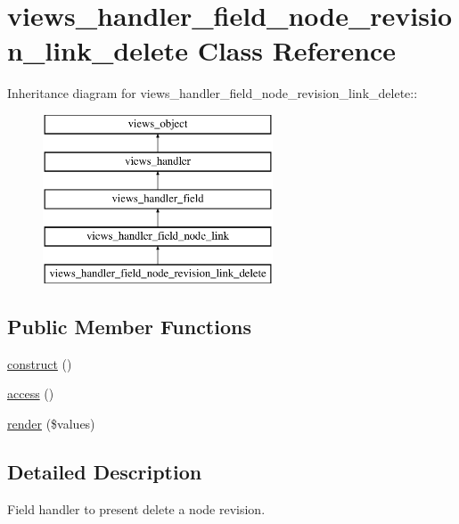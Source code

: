 \hypertarget{classviews__handler__field__node__revision__link__delete}{
\section{views\_\-handler\_\-field\_\-node\_\-revision\_\-link\_\-delete Class Reference}
\label{classviews__handler__field__node__revision__link__delete}
}
Inheritance diagram for views\_\-handler\_\-field\_\-node\_\-revision\_\-link\_\-delete::\begin{figure}[H]
\begin{center}
\leavevmode
\includegraphics[height=5cm]{classviews__handler__field__node__revision__link__delete}
\end{center}
\end{figure}
\subsection*{Public Member Functions}
\begin{CompactItemize}
\item 
\hyperlink{classviews__handler__field__node__revision__link__delete_bec2f48d4827ff818da9c22716ccbd78}{construct} ()
\item 
\hyperlink{classviews__handler__field__node__revision__link__delete_8d1e660c4945e837ced26d6f12a6521e}{access} ()
\item 
\hyperlink{classviews__handler__field__node__revision__link__delete_366322147e080ffbfc7f427d2a522362}{render} (\$values)
\end{CompactItemize}


\subsection{Detailed Description}
Field handler to present delete a node revision. 

